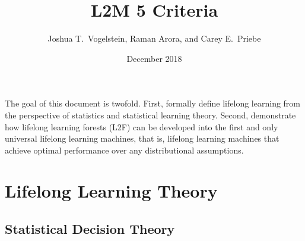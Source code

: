 \documentclass{article}
\title{L2M 5 Criteria}
\author{Joshua T.~Vogelstein, Raman Arora, and Carey E.~Priebe}
\affil{Johns Hopkins University}
\date{December 2018}
\begin{document}
\maketitle

The goal of this document is twofold. First, formally define lifelong learning from the perspective of statistics and statistical learning theory.  Second, demonstrate how lifelong learning forests (L2F) can be developed into the first and only universal lifelong learning machines, that is, lifelong learning machines that achieve optimal performance over any distributional assumptions.  

\tableofcontents

\clearpage
\setcounter{section}{-1}
\section{Lifelong Learning Theory}
\subsection{Statistical Decision Theory}
\end{document}
